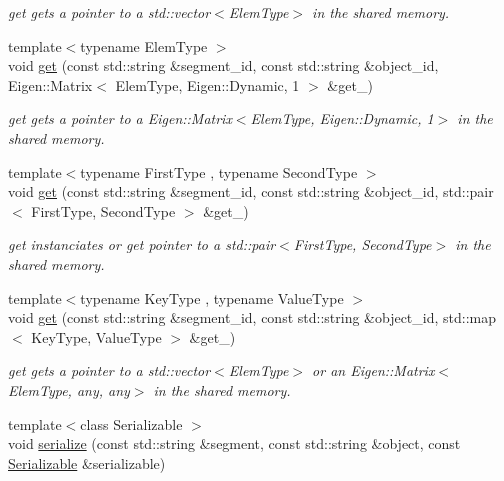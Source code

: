 \begin{DoxyCompactItemize}
\begin{DoxyCompactList}\small\item\em get gets a pointer to a std\+::vector$<$\+Elem\+Type$>$ in the shared memory. \end{DoxyCompactList}\item 
{\footnotesize template$<$typename Elem\+Type $>$ }\\void \hyperlink{namespaceshared__memory_a4e230e55e38089aee71cd6df93110174}{get} (const std\+::string \&segment\+\_\+id, const std\+::string \&object\+\_\+id, Eigen\+::\+Matrix$<$ Elem\+Type, Eigen\+::\+Dynamic, 1 $>$ \&get\+\_\+)
\begin{DoxyCompactList}\small\item\em get gets a pointer to a Eigen\+::\+Matrix$<$\+Elem\+Type, Eigen\+::\+Dynamic, 1$>$ in the shared memory. \end{DoxyCompactList}\item 
{\footnotesize template$<$typename First\+Type , typename Second\+Type $>$ }\\void \hyperlink{namespaceshared__memory_a2579e9a10a16e0fbd006900c618addc8}{get} (const std\+::string \&segment\+\_\+id, const std\+::string \&object\+\_\+id, std\+::pair$<$ First\+Type, Second\+Type $>$ \&get\+\_\+)
\begin{DoxyCompactList}\small\item\em get instanciates or get pointer to a std\+::pair$<$\+First\+Type, Second\+Type$>$ in the shared memory. \end{DoxyCompactList}\item 
{\footnotesize template$<$typename Key\+Type , typename Value\+Type $>$ }\\void \hyperlink{namespaceshared__memory_add6604c2716e51cdcf17de2439251089}{get} (const std\+::string \&segment\+\_\+id, const std\+::string \&object\+\_\+id, std\+::map$<$ Key\+Type, Value\+Type $>$ \&get\+\_\+)
\begin{DoxyCompactList}\small\item\em get gets a pointer to a std\+::vector$<$\+Elem\+Type$>$ or an Eigen\+::\+Matrix$<$\+Elem\+Type, any, any$>$ in the shared memory. \end{DoxyCompactList}\item 
{\footnotesize template$<$class Serializable $>$ }\\void \hyperlink{namespaceshared__memory_a003005dc269ebf79f08523dc0f8d1ed0}{serialize} (const std\+::string \&segment, const std\+::string \&object, const \hyperlink{classSerializable}{Serializable} \&serializable)

\end{DoxyCompactItemize}

